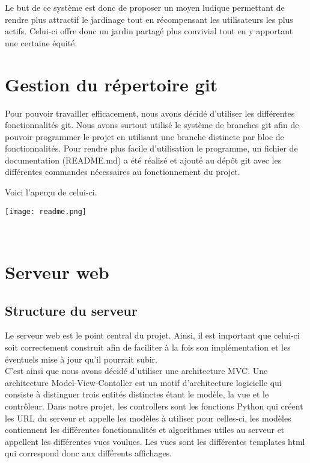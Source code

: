 \documentclass[12pt,titlepage]{report}
\begin{document}
Le but de ce système est donc de proposer un moyen ludique permettant de rendre plus attractif le jardinage tout en récompensant les utilisateurs les plus actifs. Celui-ci offre donc un jardin partagé plus convivial tout en y apportant une certaine équité. 


\chapter{Gestion du répertoire git}

Pour pouvoir travailler efficacement, nous avons décidé d’utiliser les différentes fonctionnalités git.
Nous avons surtout utilisé le système de branches git afin de pouvoir programmer le projet en utilisant une branche distincte par bloc de fonctionnalités. Pour rendre plus facile d’utilisation le programme, un fichier de documentation (README.md) a été réalisé et ajouté au dépôt git avec les différentes commandes nécessaires au fonctionnement du projet. 

Voici l'aperçu de celui-ci.

\begin{center}
    \texttt{[image: readme.png]} 
\end{center}
\\[0.6cm]

\chapter{Serveur web}

\section{Structure du serveur}
Le serveur web est le point central du projet. Ainsi, il est important que celui-ci soit correctement construit afin de faciliter à la fois son implémentation et les éventuels mise à jour qu’il pourrait subir. \\

C’est ainsi que nous avons décidé d’utiliser une architecture MVC. Une architecture Model-View-Contoller est un motif d'architecture logicielle qui consiste à distinguer trois entités distinctes étant le modèle, la vue et le contrôleur.
Dans notre projet, les controllers sont les fonctions Python qui créent les URL du serveur et appelle les modèles à utiliser pour celles-ci, les modèles contiennent les différentes fonctionnalités et algorithmes utiles au serveur et appellent les différentes vues voulues. 
Les vues sont les différentes templates html qui correspond donc aux différents affichages. \\
\end{document}
